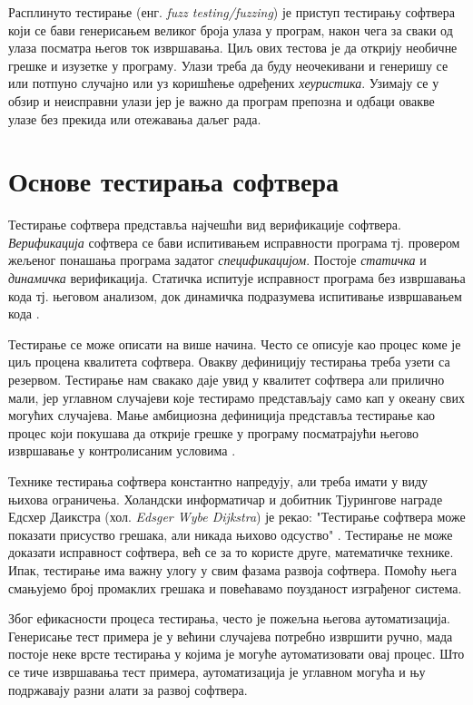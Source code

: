 \documentclass[12pt,oneside]{memoir}
\begin{document}
Расплинуто тестирање (енг. \textit{fuzz testing/fuzzing}) је приступ тестирању софтвера који се бави генерисањем великог броја улаза у програм, након чега за сваки од улаза посматра његов ток извршавања. Циљ ових тестова је да открију необичне грешке и изузетке у програму. Улази треба да буду неочекивани и генеришу се или потпуно случајно или уз коришћење одређених \textit{хеуристика}. Узимају се у обзир и неисправни улази јер је важно да програм препозна и одбаци овакве улазе без прекида или отежавања даљег рада. %

\section{Основе тестирања софтвера}
\label{sec:osnoveTestiranja}

Тестирање софтвера представља најчешћи вид верификације софтвера. \textit{Верификација} софтвера се бави испитивањем исправности програма тј. провером жељеног понашања програма задатог \textit{спецификацијом}. Постоје \textit{статичка} и \textit{динамичка} верификација. Статичка испитује исправност програма без извршавања кода тј. његовом анализом, док динамичка подразумева испитивање извршавањем кода \cite{milenaDokt}. 

Тестирање се може описати на више начина. Често се описује као процес коме је циљ процена квалитета софтвера. Овакву дефиницију тестирања треба узети са резервом. Тестирање нам свакако даје увид у квалитет софтвера али прилично мали, јер углавном случајеви које тестирамо представљају само кап у океану свих могућих случајева. Мање амбициозна дефиниција представља тестирање као процес који покушава да открије грешке у програму посматрајући његово извршавање у контролисаним условима \cite{testPrinc}.

Технике тестирања софтвера константно напредују, али треба имати у виду њихова ограничења. Холандски информатичар и добитник Тјурингове награде Едсхер Даикстра (хол. \textit{Edsger Wybe Dijkstra}) је рекао: "Тестирање софтвера може показати присуство грешака, али никада њихово одсуство" \cite{testPrinc}. Тестирање не може доказати исправност софтвера, већ се за то користе друге, математичке технике. Ипак, тестирање има важну улогу у свим фазама развоја софтвера. Помоћу њега смањујемо број промаклих грешака и повећавамо поузданост изграђеног система.

Због ефикасности процеса тестирања, често је пожељна његова аутоматизација. Генерисање тест примера је у већини случајева потребно извршити ручно, мада постоје неке врсте тестирања у којима је могуће аутоматизовати овај процес. Што се тиче извршавања тест примера, аутоматизација је углавном могућа и њу подржавају разни алати за развој софтвера.
\end{document}
